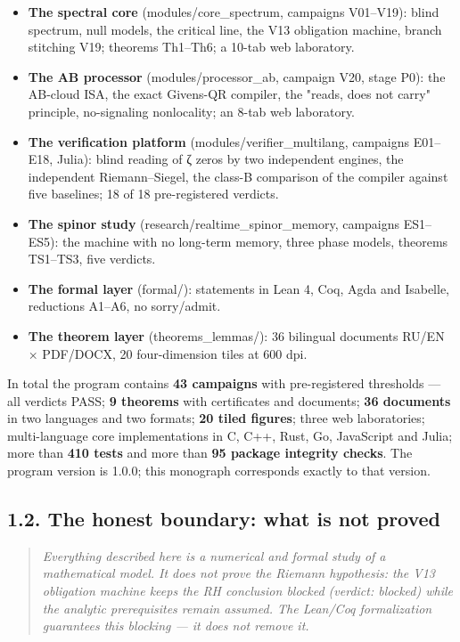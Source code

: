 \documentclass[11pt,a4paper]{article}
\begin{document}
\begin{itemize}
  \item \textbf{The spectral core} (modules/core\_spectrum, campaigns V01–V19): blind spectrum, null models, the critical line, the V13 obligation machine, branch stitching V19; theorems Th1–Th6; a 10-tab web laboratory.
  \item \textbf{The AB processor} (modules/processor\_ab, campaign V20, stage P0): the AB-cloud ISA, the exact Givens-QR compiler, the "reads, does not carry" principle, no-signaling nonlocality; an 8-tab web laboratory.
  \item \textbf{The verification platform} (modules/verifier\_multilang, campaigns E01–E18, Julia): blind reading of ζ zeros by two independent engines, the independent Riemann–Siegel, the class-B comparison of the compiler against five baselines; 18 of 18 pre-registered verdicts.
  \item \textbf{The spinor study} (research/realtime\_spinor\_memory, campaigns ES1–ES5): the machine with no long-term memory, three phase models, theorems TS1–TS3, five verdicts.
  \item \textbf{The formal layer} (formal/): statements in Lean 4, Coq, Agda and Isabelle, reductions A1–A6, no sorry/admit.
  \item \textbf{The theorem layer} (theorems\_lemmas/): 36 bilingual documents RU/EN × PDF/DOCX, 20 four-dimension tiles at 600 dpi.
\end{itemize}

In total the program contains \textbf{43 campaigns} with pre-registered thresholds — all verdicts PASS; \textbf{9 theorems} with certificates and documents; \textbf{36 documents} in two languages and two formats; \textbf{20 tiled figures}; three web laboratories; multi-language core implementations in C, C++, Rust, Go, JavaScript and Julia; more than \textbf{410 tests} and more than \textbf{95 package integrity checks}. The program version is 1.0.0; this monograph corresponds exactly to that version.

\subsection{1.2. The honest boundary: what is not proved}

\begin{quote}\itshape Everything described here is a numerical and formal study of a mathematical model. It does not prove the Riemann hypothesis: the V13 obligation machine keeps the RH conclusion blocked (verdict: blocked) while the analytic prerequisites remain assumed. The Lean/Coq formalization guarantees this blocking — it does not remove it.\end{quote}
\end{document}
